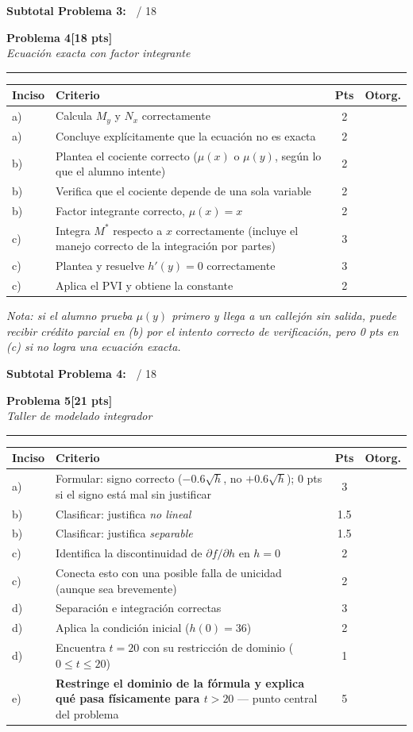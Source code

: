 \documentclass[11pt,letterpaper]{article}
\makeatletter
\newcommand{\problema}[3]{%
  \bigskip\bigskip\noindent
  {\Large\textbf{Problema #1}}\hfill\textbf{[#2 pts]}\\[3pt]
  {\small\itshape #3}\par
  \vspace{2pt}\hrule\vspace{8pt}
}
\newenvironment{tablarubrica}{%
  \begin{tabular}{@{}p{1.1cm}Lcc@{}}
  \toprule
  \textbf{Inciso} & \textbf{Criterio} & \textbf{Pts} & \textbf{Otorg.} \\
  \midrule
}{%
  \bottomrule
  \end{tabular}
}
\makeatother
\begin{document}
\medskip
\noindent\textbf{Subtotal Problema 3:\ } \underline{\hspace{2.5cm}} / 18

\newpage
\problema{4}{18}{Ecuación exacta con factor integrante}

\begin{tablarubrica}
a) & Calcula $M_y$ y $N_x$ correctamente & 2 & \\
a) & Concluye explícitamente que la ecuación no es exacta & 2 & \\
b) & Plantea el cociente correcto ($\mu(x)$ o $\mu(y)$, según lo que el alumno intente) & 2 & \\
b) & Verifica que el cociente depende de una sola variable & 2 & \\
b) & Factor integrante correcto, $\mu(x)=x$ & 2 & \\
c) & Integra $M^*$ respecto a $x$ correctamente (incluye el manejo correcto de la integración por partes) & 3 & \\
c) & Plantea y resuelve $h'(y)=0$ correctamente & 3 & \\
c) & Aplica el PVI y obtiene la constante & 2 & \\
\end{tablarubrica}

\textit{Nota: si el alumno prueba $\mu(y)$ primero y llega a un callejón sin salida, puede recibir crédito parcial en (b) por el intento correcto de verificación, pero 0 pts en (c) si no logra una ecuación exacta.}

\medskip
\noindent\textbf{Subtotal Problema 4:\ } \underline{\hspace{2.5cm}} / 18

\problema{5}{21}{Taller de modelado integrador}

\begin{tablarubrica}
a) & Formular: signo correcto ($-0.6\sqrt h$, no $+0.6\sqrt h$); 0 pts si el signo está mal sin justificar & 3 & \\
b) & Clasificar: justifica \emph{no lineal} & 1.5 & \\
b) & Clasificar: justifica \emph{separable} & 1.5 & \\
c) & Identifica la discontinuidad de $\partial f/\partial h$ en $h=0$ & 2 & \\
c) & Conecta esto con una posible falla de unicidad (aunque sea brevemente) & 2 & \\
d) & Separación e integración correctas & 3 & \\
d) & Aplica la condición inicial ($h(0)=36$) & 2 & \\
d) & Encuentra $t=20$ con su restricción de dominio ($0\le t\le20$) & 1 & \\
e) & \textbf{Restringe el dominio de la fórmula y explica qué pasa físicamente para $t>20$} — punto central del problema & 5 & \\
\end{tablarubrica}
\end{document}
